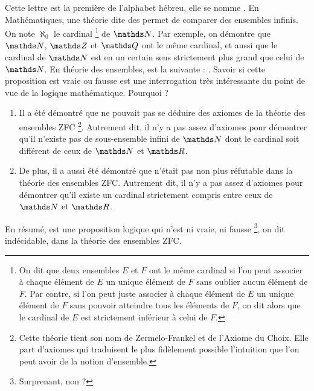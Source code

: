 
\cadre{$\aleph$} Cette lettre est  la première de l'alphabet hébreu, elle se nomme . En Mathématiques, une théorie dite des  permet de comparer des ensembles infinis. On note $\aleph_0$ le cardinal
    \footnote{On dit que deux ensembles $E$ et $F$  ont le même cardinal si l'on peut associer à chaque élément de $E$ un unique élément de $F$ sans oublier aucun élément de $F$. Par contre, si l'on peut juste associer à chaque élément de $E$ un unique élément de $F$ sans pouvoir atteindre tous les éléments de $F$, on dit alors que le cardinal de $E$ est strictement inférieur à celui de $F$. }
    de $\NN$. Par exemple, on démontre que $\NN$, $\ZZ$ et $\QQ$ ont le même cardinal, et aussi que le cardinal de $\NN$ est en un certain sens strictement plus grand que celui de $\NN$.
    En théorie des ensembles,  est la suivante : . Savoir si cette proposition est vraie ou fausse est une interrogation très intéressante du point de vue de la logique mathématique. Pourquoi ?

\begin{enumerate}
    \item Il a été démontré que  ne pouvait pas se déduire des axiomes de la théorie des ensembles ZFC
        \footnote{Cette théorie tient son nom de Zermelo-Frankel et de l'Axiome du Choix. Elle part d'axiomes qui traduisent le plus fidèlement possible l'intuition que l'on peut avoir de la notion d'ensemble.}.
    Autrement dit, il n'y a pas assez d'axiomes pour démontrer qu'il n'existe pas de sous-ensemble infini de $\NN$ dont le cardinal soit différent de ceux de $\NN$ et $\RR$.

    \item De plus, il a aussi été démontré que  n'était pas non plus réfutable dans la théorie des ensembles ZFC.
    Autrement dit, il n'y a pas assez d'axiomes pour démontrer qu'il existe un cardinal strictement compris entre ceux de $\NN$ et $\RR$.
\end{enumerate}

\noindent En résumé,  est une proposition logique qui n'est ni vraie, ni fausse
    \footnote{Surprenant, non ?},
on dit indécidable, dans la théorie des ensembles ZFC.
